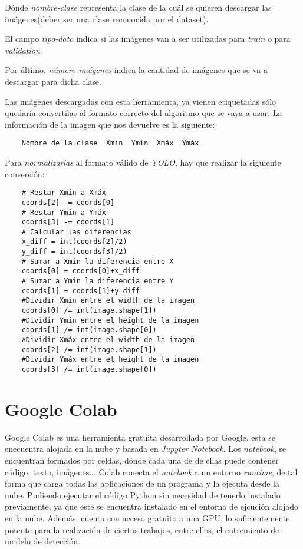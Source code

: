 Dónde \textit{nombre-clase} representa la clase de la cuál se quieren descargar las imágenes(deber ser una clase reconocida por el dataset). 

El campo \textit{tipo-dato} indica si las imágenes van a ser utilizadas para \textit{train} o para \textit{validation}.

Por último, \textit{número-imágenes} indica la cantidad de imágenes que se va a descargar para dicha clase.

Las imágenes descargadas con esta herramienta, ya vienen etiquetadas sólo quedaría convertilas al formato correcto del algoritmo que se vaya a usar. La información de la imagen que nos devuelve es la siguiente:
\begin{verbatim}
    Nombre de la clase  Xmin  Ymin  Xmáx  Ymáx
\end{verbatim}
Para \textit{normalizarlas} al formato válido de \textit{YOLO}, hay que realizar la siguiente conversión:    
\begin{verbatim}
    # Restar Xmin a Xmáx
    coords[2] -= coords[0]
    # Restar Ymin a Ymáx
    coords[3] -= coords[1]
    # Calcular las diferencias
    x_diff = int(coords[2]/2)
    y_diff = int(coords[3]/2)
    # Sumar a Xmin la diferencia entre X
    coords[0] = coords[0]+x_diff
    # Sumar a Ymin la diferencia entre Y
    coords[1] = coords[1]+y_diff
    #Dividir Xmin entre el width de la imagen
    coords[0] /= int(image.shape[1])
    #Dividir Ymin entre el height de la imagen
    coords[1] /= int(image.shape[0])
    #Dividir Xmáx entre el width de la imagen
    coords[2] /= int(image.shape[1])
    #Dividir Ymáx entre el height de la imagen
    coords[3] /= int(image.shape[0])
\end{verbatim}

\section{Google Colab} \label{colab}
Google Colab \cite{colab} es una herramienta gratuita desarrollada por Google, esta se enecuentra alojada en la nube y basada en \textit{Jupyter Notebook}.
Los \textit{notebook}, se encuentran formados por celdas, dónde cada una de de ellas puede contener código, texto, imágenes... Colab conecta el \textit{notebook} a un entorno \textit{runtime}, de tal forma que carga todas las aplicaciones de un programa y la ejecuta desde la nube. Pudiendo ejecutar el código Python sin necesidad de tenerlo instalado previamente, ya que este se encuentra instalado en el entorno de ejcución alojado en la nube.
Además, cuenta con acceso gratuito a una GPU, lo suficientemente potente para la realización de ciertos trabajos, entre ellos, el entremiento de modelo de detección.

